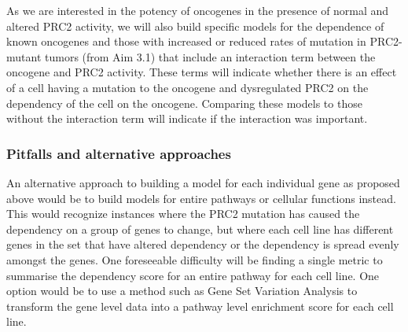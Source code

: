 As we are interested in the potency of oncogenes in the presence of normal and altered PRC2 activity, we will also build specific models for the dependence of known oncogenes and those with increased or reduced rates of mutation in PRC2-mutant tumors (from Aim 3.1) that include an interaction term between the oncogene and PRC2 activity.
These terms will indicate whether there is an effect of a cell having a mutation to the oncogene and dysregulated PRC2 on the dependency of the cell on the oncogene.
Comparing these models to those without the interaction term will indicate if the interaction was important.


\subsubsection*{Pitfalls and alternative approaches}

An alternative approach to building a model for each individual gene as proposed above would be to build models for entire pathways or cellular functions instead.
This would recognize instances where the PRC2 mutation has caused the dependency on a group of genes to change, but where each cell line has different genes in the set that have altered dependency or the dependency is spread evenly amongst the genes.
One foreseeable difficulty will be finding a single metric to summarise the dependency score for an entire pathway for each cell line.
One option would be to use a method such as Gene Set Variation Analysis \cite{Hanzelmann2013} to transform the gene level data into a pathway level enrichment score for each cell line.
